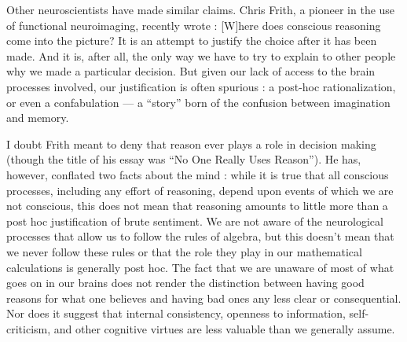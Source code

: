 \documentclass[a4paper,14pt]{extbook}
\begin{document}
Other neuroscientists have made similar claims.
Chris Frith, a pioneer in the use of functional neuroimaging, recently wrote :
[W]here does conscious reasoning come into the picture?
It is an attempt to justify the choice after it has been made.
And it is, after all, the only way we have to try to explain to other people why we made a particular decision.
But given our lack of access to the brain processes involved, our justification is often spurious :
a post-hoc rationalization, or even a confabulation --- a ``story'' born of the confusion between imagination and memory.

I doubt Frith meant to deny that reason ever plays a role in decision making (though the title of his essay was ``No One Really Uses Reason'').
He has, however, conflated two facts about the mind :
while it is true that all conscious processes, including any effort of reasoning, depend upon events of which we are not conscious, this does not mean that reasoning amounts to little more than a post hoc justification of brute sentiment.
We are not aware of the neurological processes that allow us to follow the rules of algebra, but this doesn’t mean that we never follow these rules or that the role they play in our mathematical calculations is generally post hoc.
The fact that we are unaware of most of what goes on in our brains does not render the distinction between having good reasons for what one believes and having bad ones any less clear or consequential.
Nor does it suggest that internal consistency, openness to information, self-criticism, and other cognitive virtues are less valuable than we generally assume.
\end{document}
